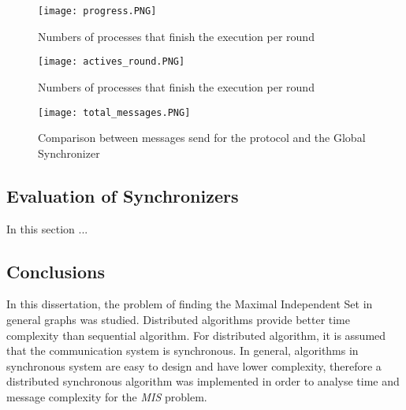 \begin{figure}[ht]
\centering
\texttt{[image: progress.PNG]} 
\caption{Numbers of processes that finish the execution per round}
\label{fig:progression}
\end{figure}

\begin{figure}[ht]
\centering
\texttt{[image: actives\_round.PNG]} 
\caption{Numbers of processes that finish the execution per round}
\label{fig:actives}
\end{figure}


\begin{figure}[ht]
\centering
\texttt{[image: total\_messages.PNG]} 
\caption{Comparison between messages send for the protocol and the Global Synchronizer}
\label{fig:total_msg}
\end{figure}


 
\subsection{Evaluation of Synchronizers}

In this section ...

\subsection{Conclusions}

In this dissertation, the problem of finding the Maximal Independent Set in general graphs was studied. Distributed algorithms provide better time complexity than sequential algorithm. For distributed algorithm, it is assumed that the communication system is synchronous. In general, algorithms in synchronous system are easy to design and have lower complexity, therefore a distributed synchronous algorithm was implemented in order to analyse time and message complexity for the \textit{MIS} problem.

